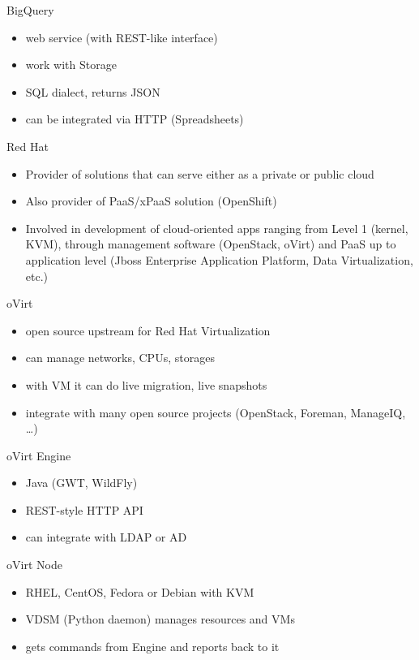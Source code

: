 \documentclass[presentation]{beamer}
\begin{document}
\begin{frame}[label={sec:org66c057f}]{BigQuery}
\begin{itemize}
\item web service (with REST-like interface)
\item work with Storage
\item SQL dialect, returns JSON
\item can be integrated via HTTP (Spreadsheets)
\end{itemize}
\end{frame}

\begin{frame}[label={sec:org88e2426}]{Red Hat}
\begin{itemize}
\item Provider of solutions that can serve either as a private or public
cloud
\item Also provider of PaaS/xPaaS solution (OpenShift)
\item Involved in development of cloud-oriented apps ranging from Level 1
(kernel, KVM), through management software (OpenStack, oVirt) and
PaaS up to application level (Jboss Enterprise Application Platform,
Data Virtualization, etc.)
\end{itemize}
\end{frame}

\begin{frame}[label={sec:orgc7719c6}]{oVirt}
\begin{itemize}
\item open source upstream for Red Hat Virtualization
\item can manage networks, CPUs, storages
\item with VM it can do live migration, live snapshots
\item integrate with many open source projects (OpenStack, Foreman, ManageIQ, \ldots{})
\end{itemize}

\begin{block}{oVirt Engine}
\begin{itemize}
\item Java (GWT, WildFly)
\item REST-style HTTP API
\item can integrate with LDAP or AD
\end{itemize}
\end{block}

\begin{block}{oVirt Node}
\begin{itemize}
\item RHEL, CentOS, Fedora or Debian with KVM
\item VDSM (Python daemon) manages resources and VMs
\item gets commands from Engine and reports back to it
\end{itemize}
\end{block}
\end{frame}
\end{document}
